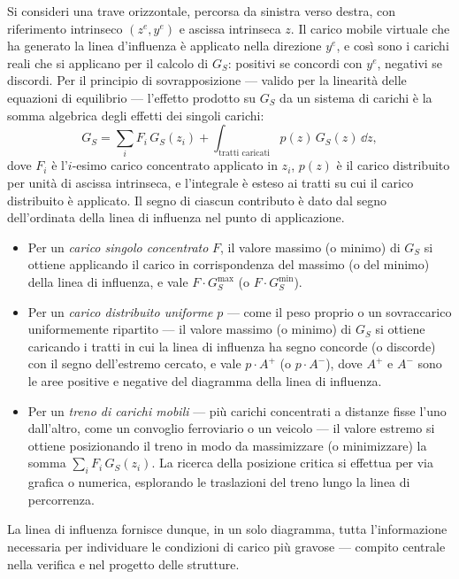 Si consideri una trave orizzontale, percorsa da sinistra verso
destra, con riferimento intrinseco $(z^e, y^e)$ e ascissa
intrinseca $z$. Il carico mobile virtuale che ha generato la
linea d'influenza è applicato nella direzione $y^e$, e così
sono i carichi reali che si applicano per il calcolo di $G_S$:
positivi se concordi con $y^e$, negativi se discordi. Per il
principio di sovrapposizione --- valido per la linearità delle
equazioni di equilibrio --- l'effetto prodotto su $G_S$ da un
sistema di carichi è la somma algebrica degli effetti dei
singoli carichi:
\begin{equation}\label{eq:sovrapposizione_LI}
	G_S = \sum_{i} F_i \, G_S(z_i)
	+ \int_{\text{tratti caricati}} p(z)\, G_S(z)\, \dd z,
\end{equation}
dove $F_i$ è l'$i$-esimo carico concentrato applicato in $z_i$,
$p(z)$ è il carico distribuito per unità di ascissa intrinseca,
e l'integrale è esteso ai tratti su cui il carico distribuito è
applicato. Il segno di ciascun contributo è dato dal segno
dell'ordinata della linea di influenza nel punto di applicazione.
\begin{itemize}[noitemsep,topsep=2pt]
	\item Per un \emph{carico singolo concentrato} $F$, il valore
	massimo (o minimo) di $G_S$ si ottiene applicando il carico
	in corrispondenza del massimo (o del minimo) della linea di
	influenza, e vale $F \cdot G_S^{\max}$ (o $F \cdot G_S^{\min}$).
	\item Per un \emph{carico distribuito uniforme} $p$ --- come
	il peso proprio o un sovraccarico uniformemente ripartito ---
	il valore massimo (o minimo) di $G_S$ si ottiene caricando i
	tratti in cui la linea di influenza ha segno concorde (o
	discorde) con il segno dell'estremo cercato, e vale
	$p \cdot A^+$ (o $p \cdot A^-$), dove $A^+$ e $A^-$ sono le
	aree positive e negative del diagramma della linea di
	influenza.
	\item Per un \emph{treno di carichi mobili} --- più carichi
	concentrati a distanze fisse l'uno dall'altro, come un
	convoglio ferroviario o un veicolo --- il valore estremo si
	ottiene posizionando il treno in modo da massimizzare (o
	minimizzare) la somma $\sum_i F_i \, G_S(z_i)$. La ricerca
	della posizione critica si effettua per via grafica o
	numerica, esplorando le traslazioni del treno lungo la linea
	di percorrenza.
\end{itemize}
La linea di influenza fornisce dunque, in un solo diagramma,
tutta l'informazione necessaria per individuare le condizioni
di carico più gravose --- compito centrale nella verifica e
nel progetto delle strutture.

